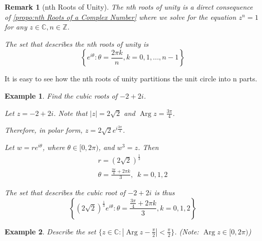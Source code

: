 \documentclass[11pt, oneside]{book}
\theoremstyle{break}
\newtheorem*{remark}{Remark}
\newtheorem{eg}{Example}[section]
\DeclareMathOperator{\caparg}{Arg}
\newcommand{\abs}[1]{\left|#1\right|}						%
\newcommand{\Arg}[1]{\caparg #1}
\begin{document}
\begin{remark}[nth Roots of Unity]\label{remark:nth Roots of Unity}
	The nth roots of unity is a direct consequence of \cref{propo:nth Roots of a Complex Number} where we solve for the equation $z^n = 1$ for any $z \in \mathbb{C}, n \in \mathbb{Z}$.

	The set that describes the nth roots of unity is
	\begin{equation}\label{eq:nth roots of unity}
		\left\{ e^{i \theta} : \theta = \frac{2 \pi k}{n}, k = 0, 1, ..., n - 1 \right\}
	\end{equation}
\end{remark}

It is easy to see how the nth roots of unity partitions the unit circle into n parts.

\begin{eg}
	Find the cubic roots of $-2 + 2i$.

	Let $z = -2 + 2i$. Note that $\abs{z} = 2\sqrt{2}$ and $\Arg{z} = \frac{3 \pi }{4}$.

	Therefore, in polar form, $z = 2 \sqrt{2} e^{i \frac{3\pi}{4} }$.

	Let $w = re^{i \theta}$, where $\theta \in [0, 2\pi)$, and $w^3 = z$. Then
	\begin{gather*}
		r = (2 \sqrt{2})^\frac{1}{3} \\
		\theta = \frac{\frac{3\pi}{4} + 2 \pi k}{3}, \enspace k = 0, 1, 2
	\end{gather*}

	The set that describes the cubic root of $-2 + 2i$ is thus
	\begin{equation*}
		\left\{ (2\sqrt{2})^\frac{1}{3} e^{i \theta} : \theta = \frac{\frac{3\pi}{4} + 2 \pi k}{3}, k = 0, 1, 2 \right\}
	\end{equation*}
\end{eg}

\begin{eg}
	Describe the set $\{z \in \mathbb{C} : \abs{\Arg{z} - \frac{\pi}{2}} < \frac{\pi}{2} \}$. (Note: $\Arg{z} \in [0, 2\pi)$)

	\begin{center}
	\end{center}
\end{eg}
\end{document}

